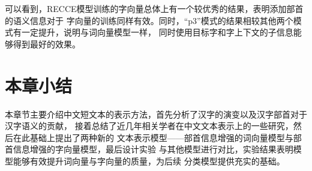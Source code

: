 可以看到，RECCE模型训练的字向量总体上有一个较优秀的结果，表明添加部首的语义信息对于
字向量的训练同样有效。同时，“p3”模式的结果相较其他两个模式有一定提升，说明与词向量模型一样，
同时使用目标字和字上下文的子信息能够得到最好的效果。
\section{本章小结}
本章节主要介绍中文短文本的表示方法，首先分析了汉字的演变以及汉字部首对于汉字语义的贡献，
接着总结了近几年相关学者在中文文本表示上的一些研究，然后在此基础上提出了两种新的
文本表示模型——部首信息增强的词向量模型与部首信息增强的字向量模型，最后设计实验
与其他模型进行对比，实验结果表明模型能够有效提升词向量与字向量的质量，为后续
分类模型提供充实的基础。